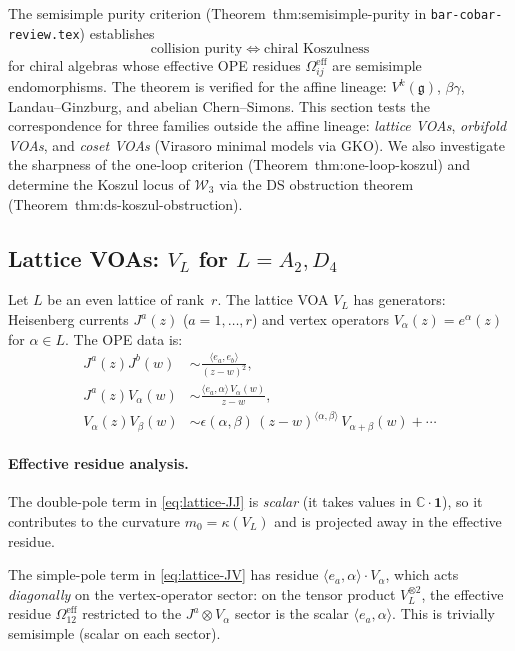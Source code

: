 \documentclass[11pt]{article}
\newcommand{\cW}{\mathcal{W}}
\newcommand{\C}{\mathbb{C}}
\begin{document}
The semisimple purity criterion (Theorem~thm:semisimple-purity
in \texttt{bar-cobar-review.tex}) establishes
\[
\text{collision purity}
\;\Longleftrightarrow\;
\text{chiral Koszulness}
\]
for chiral algebras whose effective OPE residues
$\Omega_{ij}^{\mathrm{eff}}$ are semisimple endomorphisms.
The theorem is verified for the affine lineage:
$V^k(\mathfrak{g})$, $\beta\gamma$, Landau--Ginzburg, and
abelian Chern--Simons.  This section tests the correspondence
for three families outside the affine lineage:
\emph{lattice VOAs}, \emph{orbifold VOAs}, and
\emph{coset VOAs} (Virasoro minimal models via GKO).
We also investigate the sharpness of the one-loop criterion
(Theorem~thm:one-loop-koszul) and determine the Koszul
locus of $\cW_3$ via the DS obstruction theorem
(Theorem~thm:ds-koszul-obstruction).

\subsection{Lattice VOAs: $V_L$ for $L = A_2, D_4$}
\label{subsec:lattice-purity}

Let $L$ be an even lattice of rank~$r$.  The lattice VOA
$V_L$ has generators: Heisenberg currents $J^a(z)$
($a = 1,\ldots,r$) and vertex operators $V_\alpha(z) = e^\alpha(z)$
for $\alpha \in L$.  The OPE data is:
\begin{align}
J^a(z) J^b(w) &\sim \frac{\langle e_a, e_b \rangle}{(z-w)^2},
  \label{eq:lattice-JJ}\\
J^a(z) V_\alpha(w) &\sim
  \frac{\langle e_a, \alpha\rangle\, V_\alpha(w)}{z-w},
  \label{eq:lattice-JV}\\
V_\alpha(z) V_\beta(w) &\sim
  \epsilon(\alpha,\beta)\,
  (z-w)^{\langle\alpha,\beta\rangle}\,
  V_{\alpha+\beta}(w) + \cdots
  \label{eq:lattice-VV}
\end{align}

\paragraph{Effective residue analysis.}
The double-pole term in \eqref{eq:lattice-JJ} is
\emph{scalar} (it takes values in $\C\cdot\mathbf{1}$),
so it contributes to the curvature $m_0 = \kappa(V_L)$
and is projected away in the effective residue.

The simple-pole term in \eqref{eq:lattice-JV} has residue
$\langle e_a, \alpha\rangle \cdot V_\alpha$, which acts
\emph{diagonally} on the vertex-operator sector: on the
tensor product $V_L^{\otimes 2}$, the effective residue
$\Omega_{12}^{\mathrm{eff}}$ restricted to the
$J^a \otimes V_\alpha$ sector is the scalar
$\langle e_a, \alpha\rangle$.  This is trivially semisimple
(scalar on each sector).
\end{document}

